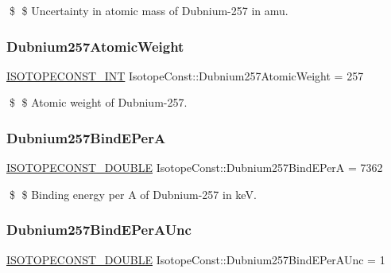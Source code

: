 \$ \$ Uncertainty in atomic mass of Dubnium-\/257 in amu. \mbox{\label{group___isotope_const-_dubnium-_db257_ga33d25be9a40b9d03270ed917ff6051b9}} 
\subsubsection{\texorpdfstring{Dubnium257\+Atomic\+Weight}{Dubnium257AtomicWeight}}
{\footnotesize\ttfamily \mbox{\hyperlink{group___isotope_const-_macros_ga5f18360b3e99483a35c32d789e62621c}{I\+S\+O\+T\+O\+P\+E\+C\+O\+N\+S\+T\+\_\+\+I\+NT}} Isotope\+Const\+::\+Dubnium257\+Atomic\+Weight = 257}

\$ \$ Atomic weight of Dubnium-\/257. \mbox{\label{group___isotope_const-_dubnium-_db257_gaa5d8696391cac9188dc5f07de58d9e2c}} 
\subsubsection{\texorpdfstring{Dubnium257\+Bind\+E\+PerA}{Dubnium257BindEPerA}}
{\footnotesize\ttfamily \mbox{\hyperlink{group___isotope_const-_macros_ga8f45a7272ce02c0b4c65c44636ed719a}{I\+S\+O\+T\+O\+P\+E\+C\+O\+N\+S\+T\+\_\+\+D\+O\+U\+B\+LE}} Isotope\+Const\+::\+Dubnium257\+Bind\+E\+PerA = 7362}

\$ \$ Binding energy per A of Dubnium-\/257 in keV. \mbox{\label{group___isotope_const-_dubnium-_db257_ga926cf280ea5f7fa35cec6d65685ecaa2}} 
\subsubsection{\texorpdfstring{Dubnium257\+Bind\+E\+Per\+A\+Unc}{Dubnium257BindEPerAUnc}}
{\footnotesize\ttfamily \mbox{\hyperlink{group___isotope_const-_macros_ga8f45a7272ce02c0b4c65c44636ed719a}{I\+S\+O\+T\+O\+P\+E\+C\+O\+N\+S\+T\+\_\+\+D\+O\+U\+B\+LE}} Isotope\+Const\+::\+Dubnium257\+Bind\+E\+Per\+A\+Unc = 1}

